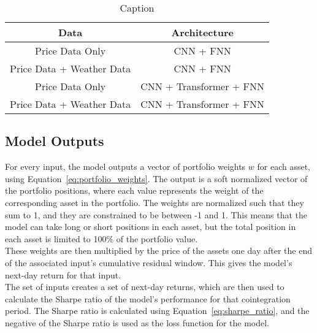 \documentclass[12pt]{article}
\begin{document}
\begin{table}[htpb]
    \centering
    \begin{tabular}{c|c}
        Data & Architecture \\ 
        \hline \hline 
        Price Data Only & CNN + FNN \\ 
        Price Data + Weather Data & CNN + FNN \\ 
        Price Data Only & CNN + Transformer + FNN \\ 
        Price Data + Weather Data & CNN + Transformer + FNN \\
        \hline \hline 
    \end{tabular}
    \caption{Caption}
    \label{tab:my_label}
\end{table}

\subsection*{Model Outputs}

For every input, the model outputs a vector of portfolio weights $w$ for each asset, using Equation~\ref{eq:portfolio_weights}. The output is a soft normalized vector of the portfolio positions, where each value represents the weight of the corresponding asset in the portfolio. The weights are normalized such that they sum to 1, and they are constrained to be between -1 and 1. This means that the model can take long or short positions in each asset, but the total position in each asset is limited to 100\% of the portfolio value. 
\\

These weights are then multiplied by the price of the assets one day after the end of the associated input's cumulative residual window. This gives the model's next-day return for that input.
\\

The set of inputs creates a set of next-day returns, which are then used to calculate the Sharpe ratio of the model's performance for that cointegration period. The Sharpe ratio is calculated using Equation~\ref{eq:sharpe_ratio}, and the negative of the Sharpe ratio is used as the loss function for the model.


 \clearpage

\end{document}
